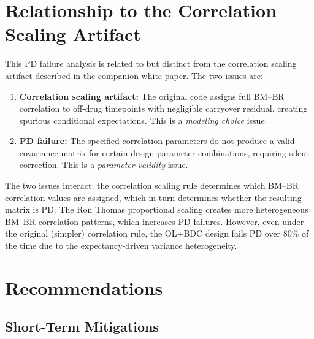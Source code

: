 \documentclass[11pt]{article}
\begin{document}
\section{Relationship to the Correlation Scaling Artifact}

This PD failure analysis is related to but distinct from the
correlation scaling artifact described in the companion white
paper. The two issues are:

\begin{enumerate}
\item \textbf{Correlation scaling artifact:} The original code
  assigns full BM--BR correlation to off-drug timepoints with
  negligible carryover residual, creating spurious conditional
  expectations. This is a \emph{modeling choice} issue.

\item \textbf{PD failure:} The specified correlation parameters
  do not produce a valid covariance matrix for certain
  design-parameter combinations, requiring silent correction.
  This is a \emph{parameter validity} issue.
\end{enumerate}

The two issues interact: the correlation scaling rule determines
which BM--BR correlation values are assigned, which in turn
determines whether the resulting matrix is PD. The Ron Thomas
proportional scaling creates more heterogeneous BM--BR
correlation patterns, which increases PD failures. However,
even under the original (simpler) correlation rule, the OL+BDC
design fails PD over 80\% of the time due to the
expectancy-driven variance heterogeneity.

\section{Recommendations}

\subsection{Short-Term Mitigations}
\end{document}

